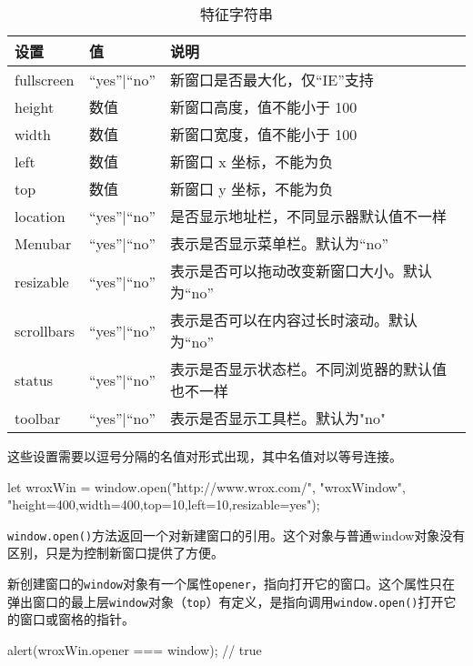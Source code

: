\begin{table}[H]
    \centering
    \small
    \caption{特征字符串}
    \label{table:特征字符串}
    \setlength{\tabcolsep}{4mm}
    \begin{tabular}{l|l|l}
        \toprule
        \textbf{设置} & \textbf{值} & \textbf{说明} \\
        \midrule
        fullscreen & ``yes''|``no'' & 新窗口是否最大化，仅“IE”支持 \\
        height & 数值 & 新窗口高度，值不能小于 100 \\
        width & 数值 & 新窗口宽度，值不能小于 100 \\
        left & 数值 & 新窗口 x 坐标，不能为负 \\
        top & 数值 & 新窗口 y 坐标，不能为负 \\
        \midrule
        location & ``yes''|``no'' & 是否显示地址栏，不同显示器默认值不一样 \\
        Menubar & ``yes''|``no'' & 表示是否显示菜单栏。默认为``no'' \\
        resizable & ``yes''|``no'' & 表示是否可以拖动改变新窗口大小。默认为``no'' \\
        scrollbars & ``yes''|``no'' & 表示是否可以在内容过长时滚动。默认为``no'' \\
        status & ``yes''|``no'' & 表示是否显示状态栏。不同浏览器的默认值也不一样 \\
        toolbar & ``yes''|``no'' & 表示是否显示工具栏。默认为"no" \\
        \bottomrule
    \end{tabular}
\end{table}

这些设置需要以逗号分隔的名值对形式出现，其中名值对以等号连接。

\begin{JavaScript}
let wroxWin = window.open("http://www.wrox.com/",
    "wroxWindow",
    "height=400,width=400,top=10,left=10,resizable=yes"); 
\end{JavaScript}

\texttt{window.open()}方法返回一个对新建窗口的引用。这个对象与普通window对象没有区别，只是为控制新窗口提供了方便。

新创建窗口的\texttt{window}对象有一个属性\texttt{opener}，指向打开它的窗口。这个属性只在弹出窗口的最上层\texttt{window}对象（\texttt{top}）有定义，是指向调用\texttt{window.open()}打开它的窗口或窗格的指针。

\begin{JavaScript}
alert(wroxWin.opener === window); // true 
\end{JavaScript}

